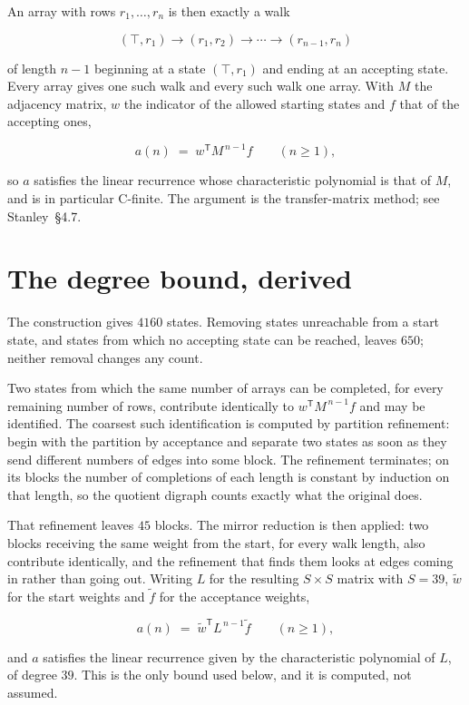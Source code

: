 \documentclass[11pt]{article}
\theoremstyle{definition}
\begin{document}
An array with rows $r_1,\dots,r_n$ is then exactly a walk

\[(\top,r_1) \to (r_1,r_2) \to \cdots \to (r_{n-1},r_n)\]

of length $n-1$ beginning at a state $(\top,r_1)$ and ending at an accepting state. Every array gives one such walk and every such walk one array. With $M$ the adjacency matrix, $w$ the indicator of the allowed starting states and $f$ that of the accepting ones,

\[a(n) \;=\; w^{\mathsf T} M^{\,n-1} f \qquad (n \ge 1),\]

so $a$ satisfies the linear recurrence whose characteristic polynomial is that of $M$, and is in particular C-finite. The argument is the transfer-matrix method; see Stanley~\S4.7.

\section{The degree bound, derived}

The construction gives $4160$ states. Removing states unreachable from a start state, and states from which no accepting state can be reached, leaves $650$; neither removal changes any count.

Two states from which the same number of arrays can be completed, for every remaining number of rows, contribute identically to $w^{\mathsf T}M^{\,n-1}f$ and may be identified. The coarsest such identification is computed by partition refinement: begin with the partition by acceptance and separate two states as soon as they send different numbers of edges into some block. The refinement terminates; on its blocks the number of completions of each length is constant by induction on that length, so the quotient digraph counts exactly what the original does.

That refinement leaves $45$ blocks. The mirror reduction is then applied: two blocks receiving the same weight from the start, for every walk length, also contribute identically, and the refinement that finds them looks at edges coming in rather than going out. Writing $L$ for the resulting $S \times S$ matrix with $S = 39$, $\tilde w$ for the start weights and $\tilde f$ for the acceptance weights,

\[a(n) \;=\; \tilde w^{\mathsf T} L^{\,n-1} \tilde f \qquad (n \ge 1),\]

and $a$ satisfies the linear recurrence given by the characteristic polynomial of $L$, of degree $39$. This is the only bound used below, and it is computed, not assumed.
\end{document}
